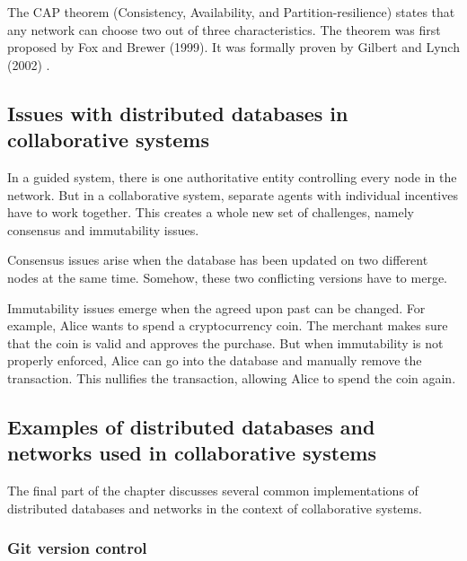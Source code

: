 The CAP theorem (Consistency, Availability, and Partition-resilience) states that any network can choose two out of three characteristics. The theorem was first proposed by Fox and Brewer (1999). It was formally proven by Gilbert and Lynch (2002) \cite{gilbert-lynch-cap-proof}.

\subsection{Issues with distributed databases in collaborative systems}
\label{subsec:issues-distributed-dbs}

In a guided system, there is one authoritative entity controlling every node in the network. But in a collaborative system, separate agents with individual incentives have to work together. This creates a whole new set of challenges, namely consensus and immutability issues.

Consensus issues arise when the database has been updated on two different nodes at the same time. Somehow, these two conflicting versions have to merge. %

Immutability issues emerge when the agreed upon past can be changed. For example, Alice wants to spend a cryptocurrency coin. The merchant makes sure that the coin is valid and approves the purchase. But when immutability is not properly enforced, Alice can go into the database and manually remove the transaction. This nullifies the transaction, allowing Alice to spend the coin again.

\subsection{Examples of distributed databases and networks used in collaborative systems}
\label{subsec:examples-distributed-dbs}

The final part of the chapter discusses several common implementations of distributed databases and networks in the context of collaborative systems. 

\subsubsection{Git version control}

